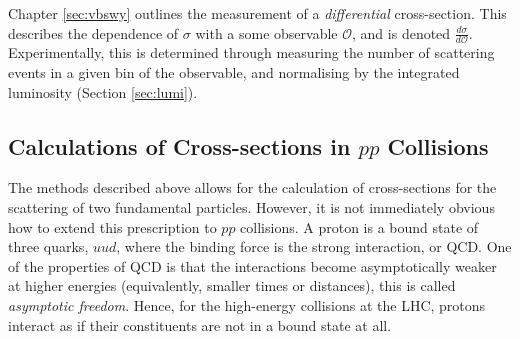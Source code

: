 Chapter \ref{sec:vbswy} outlines the measurement of a \textit{differential} cross-section. This describes the dependence of $\sigma$ with a some observable $\mathcal{O}$, and is denoted $\frac{d\sigma}{d\mathcal{O}}$. Experimentally, this is determined through measuring the number of scattering events in a given bin of the observable, and normalising by the integrated luminosity (Section \ref{sec:lumi}).

\subsection{Calculations of Cross-sections in $pp$ Collisions}

The methods described above allows for the calculation of cross-sections for the scattering of two fundamental particles. However, it is not immediately obvious how to extend this prescription to $pp$ collisions. A proton is a bound state of three quarks, $uud$, where the binding force is the strong interaction, or QCD. One of the properties of QCD is that the interactions become asymptotically weaker at higher energies (equivalently, smaller times or distances), this is called \textit{asymptotic freedom}. Hence, for the high-energy collisions at the LHC, protons interact as if their constituents are not in a bound state at all. 

